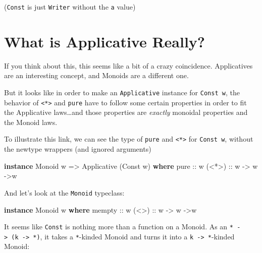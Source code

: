 \documentclass[]{article}
\newenvironment{Shaded}{}{}
\newcommand{\DataTypeTok}[1]{\textcolor[rgb]{0.56,0.13,0.00}{#1}}
\newcommand{\KeywordTok}[1]{\textcolor[rgb]{0.00,0.44,0.13}{\textbf{#1}}}
\newcommand{\NormalTok}[1]{#1}
\newcommand{\OtherTok}[1]{\textcolor[rgb]{0.00,0.44,0.13}{#1}}
\begin{document}
(\texttt{Const} is just \texttt{Writer} without the \texttt{a} value)

\hypertarget{what-is-applicative-really}{%
\section{What is Applicative Really?}\label{what-is-applicative-really}}

If you think about this, this seems like a bit of a crazy coincidence.
Applicatives are an interesting concept, and Monoids are a different one.

But it looks like in order to make an \texttt{Applicative} instance for
\texttt{Const\ w}, the behavior of \texttt{\textless{}*\textgreater{}} and
\texttt{pure} have to follow some certain properties in order to fit the
Applicative laws\ldots{}and those properties are \emph{exactly} monoidal
properties and the Monoid laws.

To illustrate this link, we can see the type of \texttt{pure} and
\texttt{\textless{}*\textgreater{}} for \texttt{Const\ w}, without the newtype
wrappers (and ignored arguments)

\begin{Shaded}
\begin{Highlighting}[]
\KeywordTok{instance} \DataTypeTok{Monoid}\NormalTok{ w }\OtherTok{=>} \DataTypeTok{Applicative}\NormalTok{ (}\DataTypeTok{Const}\NormalTok{ w) }\KeywordTok{where}
\OtherTok{    pure  ::}\NormalTok{ w}
\OtherTok{    (<*>) ::}\NormalTok{ w }\OtherTok{->}\NormalTok{ w }\OtherTok{->}\NormalTok{w}
\end{Highlighting}
\end{Shaded}

And let's look at the \texttt{Monoid} typeclass:

\begin{Shaded}
\begin{Highlighting}[]
\KeywordTok{instance} \DataTypeTok{Monoid}\NormalTok{ w }\KeywordTok{where}
\OtherTok{    mempty ::}\NormalTok{ w}
\OtherTok{    (<>)   ::}\NormalTok{ w }\OtherTok{->}\NormalTok{ w }\OtherTok{->}\NormalTok{w}
\end{Highlighting}
\end{Shaded}

It seems like \texttt{Const} is nothing more than a function on a Monoid. As an
\texttt{*\ -\textgreater{}\ (k\ -\textgreater{}\ *)}, it takes a
\texttt{*}-kinded Monoid and turns it into a
\texttt{k\ -\textgreater{}\ *}-kinded Monoid:
\end{document}

